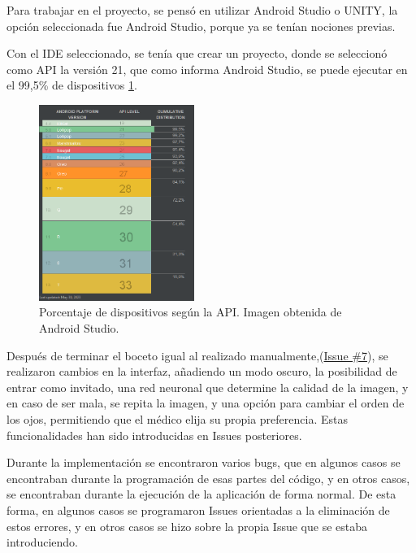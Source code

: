 Para trabajar en el proyecto, se pensó en utilizar Android Studio o UNITY, la opción seleccionada fue Android Studio, porque ya se tenían nociones previas. 

Con el IDE seleccionado, se tenía que crear un proyecto, donde se seleccionó como API la versión 21, que como informa Android Studio, se puede ejecutar en el 99,5\% de dispositivos \ref{fig:API-Android}.

        \begin{figure}[!ht]
                 \centering
                 \includegraphics[width=0.45\textwidth]{img/API-android.png}
                  \caption{Porcentaje de dispositivos según la API. Imagen obtenida de Android Studio.}
                 \label{fig:API-Android}
        \end{figure}

Después de terminar el boceto igual al realizado manualmente,(\href{https://github.com/mfg1014/Retinopatia-diabetica/issues/7}{Issue \#7}), se realizaron cambios en la interfaz, añadiendo un modo oscuro, la posibilidad de entrar como invitado, una red neuronal que determine la calidad de la imagen, y en caso de ser mala, se repita la imagen, y una opción para cambiar el orden de los ojos, permitiendo que el médico elija su propia preferencia. Estas funcionalidades han sido introducidas en Issues posteriores.

Durante la implementación se encontraron varios bugs, que en algunos casos se encontraban durante la programación de esas partes del código, y en otros casos, se encontraban durante la ejecución de la aplicación de forma normal. De esta forma, en algunos casos se programaron Issues orientadas a la eliminación de estos errores, y en otros casos se hizo sobre la propia Issue que se estaba introduciendo.

